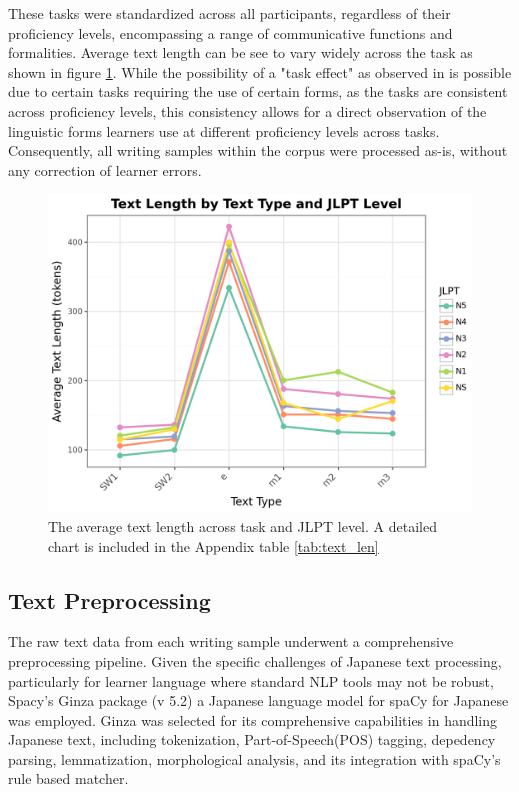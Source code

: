 These tasks were standardized across all participants, regardless of their proficiency levels, encompassing a range
of communicative functions and formalities. Average text length can be see to vary widely across the task as shown
in figure \ref{fig:text-lengths}.
While the possibility of a "task
effect" as
observed in
\citet{Alexpoulou2017} is possible due to certain tasks requiring the use of certain forms, as the tasks are
consistent across proficiency levels,
this consistency allows for a direct observation of the linguistic forms learners use at different proficiency
levels across tasks. Consequently, all writing samples within the corpus were processed as-is, without any
correction of learner
errors.

\begin{figure}[h!]
    \centering
    \includegraphics[scale=.5]{img/text_length_chart}
    \caption{The average text length across task and JLPT level. A detailed chart is
    included in the Appendix table \ref{tab:text_len}}
    \label{fig:text-lengths}
\end{figure}

\subsection{Text Preprocessing}

The raw text data from each writing sample underwent a comprehensive preprocessing pipeline. Given the specific
challenges of Japanese text processing, particularly for learner language where standard NLP tools may not be
robust, Spacy's Ginza package \cite{Ginza} (v 5.2) a Japanese language model for spaCy for Japanese was employed.
Ginza was selected for its comprehensive capabilities in handling Japanese text, including tokenization,
Part-of-Speech(POS) tagging, depedency parsing, lemmatization, morphological analysis, and its integration with
spaCy's rule based matcher.

